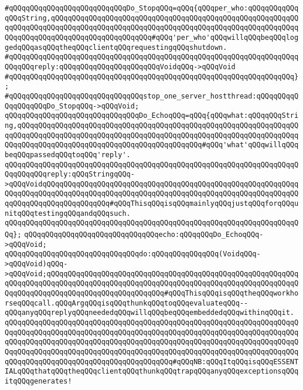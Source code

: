 \newline
\verb|#qQQqqQQqqQQqqQQqqQQqqQQqqQQqDo_StopqQQq=qQQq{qQQqper_who:qQQqqQQqqQQqqQQqString,qQQqqQQqqQQqqQQqqQQqqQQqqQQqqQQqqQQqqQQqqQQqqQQqqQQqqQQqqQQqqQQqqQQqqQQqqQQqqQQqqQQqqQQqqQQqqQQqqQQqqQQqqQQqqQQqqQQqqQQqqQQqqQQqqQQqqQQqqQQqqQQqqQQqqQQqqQQqqQQqqQQq#qQQq'per_who'qQQqwillqQQqbeqQQqloggedqQQqasqQQqtheqQQqclientqQQqrequestingqQQqshutdown.|\newline
\verb|#qQQqqQQqqQQqqQQqqQQqqQQqqQQqqQQqqQQqqQQqqQQqqQQqqQQqqQQqqQQqqQQqqQQqqQQqqQQqreply:qQQqqQQqqQQqqQQqqQQqqQQqVoidqQQq->qQQqVoid|\newline
\verb|#qQQqqQQqqQQqqQQqqQQqqQQqqQQqqQQqqQQqqQQqqQQqqQQqqQQqqQQqqQQqqQQqqQQq};|\newline
\verb|#qQQqqQQqqQQqqQQqqQQqqQQqqQQqqQQqstop_one_server_hostthread:qQQqqQQqqQQqqQQqqQQqDo_StopqQQq->qQQqVoid;|\newline
\newline
\verb|qQQqqQQqqQQqqQQqqQQqqQQqqQQqqQQqDo_EchoqQQq=qQQq{qQQqwhat:qQQqqQQqString,qQQqqQQqqQQqqQQqqQQqqQQqqQQqqQQqqQQqqQQqqQQqqQQqqQQqqQQqqQQqqQQqqQQqqQQqqQQqqQQqqQQqqQQqqQQqqQQqqQQqqQQqqQQqqQQqqQQqqQQqqQQqqQQqqQQqqQQqqQQqqQQqqQQqqQQqqQQqqQQqqQQqqQQqqQQqqQQqqQQqqQQq#qQQq'what'qQQqwillqQQqbeqQQqpassedqQQqtoqQQq'reply'.|\newline
\verb|qQQqqQQqqQQqqQQqqQQqqQQqqQQqqQQqqQQqqQQqqQQqqQQqqQQqqQQqqQQqqQQqqQQqqQQqqQQqqQQqreply:qQQqStringqQQq->qQQqVoidqQQqqQQqqQQqqQQqqQQqqQQqqQQqqQQqqQQqqQQqqQQqqQQqqQQqqQQqqQQqqQQqqQQqqQQqqQQqqQQqqQQqqQQqqQQqqQQqqQQqqQQqqQQqqQQqqQQqqQQqqQQqqQQqqQQqqQQqqQQqqQQqqQQqqQQqqQQq#qQQqThisqQQqisqQQqmainlyqQQqjustqQQqforqQQqunitqQQqtestingqQQqandqQQqsuch.|\newline
\verb|qQQqqQQqqQQqqQQqqQQqqQQqqQQqqQQqqQQqqQQqqQQqqQQqqQQqqQQqqQQqqQQqqQQqqQQq};|\newline
\verb|qQQqqQQqqQQqqQQqqQQqqQQqqQQqqQQqecho:qQQqqQQqDo_EchoqQQq->qQQqVoid;|\newline
\newline
\verb|qQQqqQQqqQQqqQQqqQQqqQQqqQQqqQQqdo:qQQqqQQqqQQqqQQq(VoidqQQq->qQQqVoid)qQQq->qQQqVoid;qQQqqQQqqQQqqQQqqQQqqQQqqQQqqQQqqQQqqQQqqQQqqQQqqQQqqQQqqQQqqQQqqQQqqQQqqQQqqQQqqQQqqQQqqQQqqQQqqQQqqQQqqQQqqQQqqQQqqQQqqQQqqQQqqQQqqQQqqQQqqQQqqQQqqQQqqQQqqQQqqQQqqQQq#qQQqThisqQQqisqQQqtheqQQqworkhorseqQQqcall.qQQqArgqQQqisqQQqthunkqQQqtoqQQqevaluateqQQq--qQQqanyqQQqreplyqQQqneededqQQqwillqQQqbeqQQqembeddedqQQqwithinqQQqit.|\newline
\verb|qQQqqQQqqQQqqQQqqQQqqQQqqQQqqQQqqQQqqQQqqQQqqQQqqQQqqQQqqQQqqQQqqQQqqQQqqQQqqQQqqQQqqQQqqQQqqQQqqQQqqQQqqQQqqQQqqQQqqQQqqQQqqQQqqQQqqQQqqQQqqQQqqQQqqQQqqQQqqQQqqQQqqQQqqQQqqQQqqQQqqQQqqQQqqQQqqQQqqQQqqQQqqQQqqQQqqQQqqQQqqQQqqQQqqQQqqQQqqQQqqQQqqQQqqQQqqQQqqQQqqQQqqQQqqQQqqQQqqQQqqQQqqQQqqQQqqQQqqQQqqQQqqQQqqQQqqQQqqQQq#qQQqNB:qQQqItqQQqisqQQqESSENTIALqQQqthatqQQqtheqQQqclientqQQqthunkqQQqtrapqQQqanyqQQqexceptionsqQQqitqQQqgenerates!|\newline
